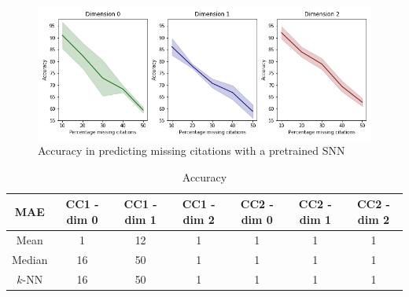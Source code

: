 

\begin{figure}[htbp]
  \centering
\includegraphics[scale=0.35]{./figures/accuracy_network1_pretrained.png}
  \caption{Accuracy in predicting missing citations with a pretrained SNN } \label{fig:transfer-learning}
\end{figure}

\begin{table}[htbp]
  \caption{%
  Accuracy
  }
  \label{table:Simplices-coauthor}
  \centering
  \scriptsize{
  \begin{tabular}{c|cccccc}
    \cmidrule(r){1-7}
    MAE   & CC1 - dim 0   & CC1 - dim 1   & CC1 - dim 2   & CC2 - dim 0  & CC2 - dim 1  & CC2 - dim 2 \\
    \midrule
    Mean & 1  & 12 & 1  & 1 & 1  & 1\\
    Median & 16 & 50 & 1  & 1& 1  & 1\\
    $k$-NN & 16 & 50& 1  & 1& 1  & 1 \\
    \bottomrule
  \end{tabular}}
\end{table}%
